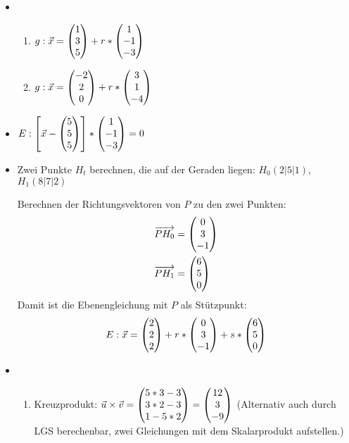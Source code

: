 \begin{lsg}{}
	\begin{itemize}
		\item
		\begin{enumerate}
			\item $g:\vec x=\begin{pmatrix} 1\\3\\5 \end{pmatrix}+r*\begin{pmatrix} 1\\-1\\-3 \end{pmatrix}$
			\item $g:\vec x=\begin{pmatrix} -2\\2\\0 \end{pmatrix}+r*\begin{pmatrix} 3\\1\\-4 \end{pmatrix}$
		\end{enumerate}
		\item $E: \left[\vec x-\begin{pmatrix} 5\\5\\5 \end{pmatrix}\right]*\begin{pmatrix} 1\\-1\\-3 \end{pmatrix}=0$
		\item Zwei Punkte $H_t$ berechnen, die auf der Geraden liegen: $H_0(2|5|1)$, $H_1(8|7|2)$

		Berechnen der Richtungsvektoren von $P$ zu den zwei Punkten:
		\begin{align*}
			\overrightarrow{PH_0}&=\begin{pmatrix} 0\\3\\-1 \end{pmatrix}\\
			\overrightarrow{PH_1}&=\begin{pmatrix} 6\\5\\0 \end{pmatrix}
		\end{align*}
		Damit ist die Ebenengleichung mit $P$ als Stützpunkt:
		\begin{equation*}
			E:\vec x=\begin{pmatrix} 2\\2\\2 \end{pmatrix}+r*\begin{pmatrix} 0\\3\\-1 \end{pmatrix}+s*\begin{pmatrix} 6\\5\\0 \end{pmatrix}
		\end{equation*}
		\item
		\begin{enumerate}
			\item Kreuzprodukt: $\vec u\times \vec v=\begin{pmatrix} 5*3-3\\3*2-3\\1-5*2 \end{pmatrix}=\begin{pmatrix} 12\\3\\-9 \end{pmatrix}$
			(Alternativ auch durch LGS berechenbar, zwei Gleichungen mit dem Skalarprodukt aufstellen.)


\end{enumerate}
\end{itemize}
\end{lsg}
